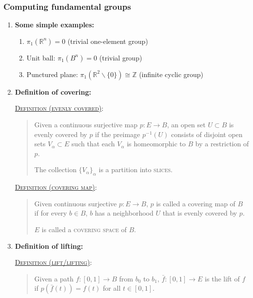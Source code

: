 \documentclass[letterpaper, 12pt]{article}
\newcommand{\RR}{\mathbb{R}}
\newcommand{\ZZ}{\mathbb{Z}}
\newcommand{\defn}[2]{\textsc{\underline{Definition (#1)}:}\begin{quote} #2\end{quote}}
\begin{document}
        \subsubsection{Computing fundamental groups}
            \begin{enumerate}[resume]
            \item \textbf{Some simple examples:}
                \begin{enumerate}
                \item $\pi_1(\RR^n) = 0$ (trivial one-element group)
                \item Unit ball: $\pi_1(B^n) = 0$ (trivial group)
                \item Punctured plane: $\pi_1(\RR^2\smallsetminus\{0\}) \cong \ZZ$ (infinite cyclic group)
                \end{enumerate}
            \item \textbf{Definition of covering:}

                \defn{evenly covered}{Given a continuous surjective map $p:E\to B$, an open set $U\subset B$ is evenly covered by $p$ if the preimage $p^{-1}(U)$ consists of disjoint open sets $V_\alpha\subset E$ such that each $V_\alpha$ is homeomorphic to $B$ by a restriction of $p$.

                The collection $\{V_\alpha\}_\alpha$ is a partition into \textsc{slices}.}

                \defn{covering map}{Given continuous surjective $p:E\to B$, $p$ is called a covering map of $B$ if for every $b\in B$, $b$ has a neighborhood $U$ that is evenly covered by $p$.

                $E$ is called a \textsc{covering space} of $B$.}
            \item \textbf{Definition of lifting:}

                \defn{lift/lifting}{Given a path $f:[0,1]\to B$ from $b_0$ to $b_1$, $\bar f : [0,1]\to E$ is the lift of $f$ if $p(\bar f(t)) = f(t)$ for all $t\in[0,1]$.}


\end{enumerate}
\end{document}
